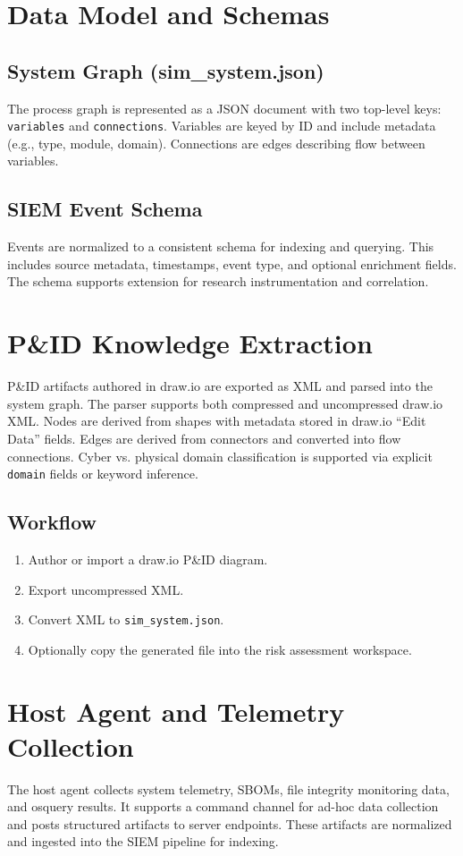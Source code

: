 \documentclass[journal]{IEEEtran}
\begin{document}
\section{Data Model and Schemas}
\subsection{System Graph (sim\_system.json)}
The process graph is represented as a JSON document with two top-level keys:
\texttt{variables} and \texttt{connections}. Variables are keyed by ID and include metadata
(e.g., type, module, domain). Connections are edges describing flow between variables.

\subsection{SIEM Event Schema}
Events are normalized to a consistent schema for indexing and querying. This includes
source metadata, timestamps, event type, and optional enrichment fields. The schema
supports extension for research instrumentation and correlation.

\section{P\&ID Knowledge Extraction}
P\&ID artifacts authored in draw.io are exported as XML and parsed into the system graph.
The parser supports both compressed and uncompressed draw.io XML. Nodes are derived
from shapes with metadata stored in draw.io ``Edit Data'' fields. Edges are derived from
connectors and converted into flow connections. Cyber vs. physical domain classification
is supported via explicit \texttt{domain} fields or keyword inference.

\subsection{Workflow}
\begin{enumerate}
  \item Author or import a draw.io P\&ID diagram.
  \item Export uncompressed XML.
  \item Convert XML to \texttt{sim\_system.json}.
  \item Optionally copy the generated file into the risk assessment workspace.
\end{enumerate}

\section{Host Agent and Telemetry Collection}
The host agent collects system telemetry, SBOMs, file integrity monitoring data, and
osquery results. It supports a command channel for ad-hoc data collection and posts
structured artifacts to server endpoints. These artifacts are normalized and ingested into
the SIEM pipeline for indexing.
\end{document}
